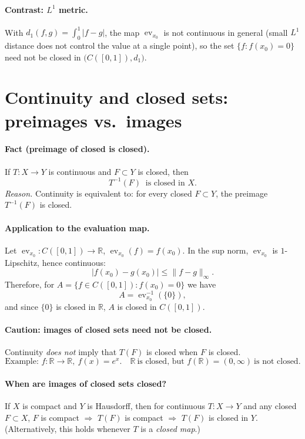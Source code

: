 \documentclass[12pt,a4paper]{article}
\begin{document}
\paragraph{Contrast: $L^1$ metric.}
With $d_1(f,g)=\int_0^1 |f-g|$, the map $\operatorname{ev}_{x_0}$ is not continuous in general
(small $L^1$ distance does not control the value at a single point),
so the set $\{f:f(x_0)=0\}$ need not be closed in $\big(C([0,1]),d_1\big)$.

\section*{Continuity and closed sets: preimages vs.\ images}

\paragraph{Fact (preimage of closed is closed).}
If $T:X\to Y$ is continuous and $F\subset Y$ is closed, then
\[
T^{-1}(F)\ \text{ is closed in } X.
\]
\emph{Reason.} Continuity is equivalent to: for every closed $F\subset Y$, the preimage $T^{-1}(F)$ is closed.

\paragraph{Application to the evaluation map.}
Let $\operatorname{ev}_{x_0}:C([0,1])\to\mathbb{R}$, $\operatorname{ev}_{x_0}(f)=f(x_0)$.  
In the sup norm, $\operatorname{ev}_{x_0}$ is $1$-Lipschitz, hence continuous:
\[
|f(x_0)-g(x_0)|\le \|f-g\|_\infty.
\]
Therefore, for $A=\{f\in C([0,1]):f(x_0)=0\}$ we have
\[
A=\operatorname{ev}_{x_0}^{-1}(\{0\}),
\]
and since $\{0\}$ is closed in $\mathbb{R}$, $A$ is closed in $C([0,1])$.

\paragraph{Caution: images of closed sets need not be closed.}
Continuity \emph{does not} imply that $T(F)$ is closed when $F$ is closed.
\[
\text{Example: } f:\mathbb{R}\to\mathbb{R},\ f(x)=e^x.
\quad \mathbb{R}\ \text{is closed, but } f(\mathbb{R})=(0,\infty)\ \text{is not closed.}
\]

\paragraph{When are images of closed sets closed?}
If $X$ is compact and $Y$ is Hausdorff, then for continuous $T:X\to Y$ and any closed $F\subset X$,
$F$ is compact $\Rightarrow$ $T(F)$ is compact $\Rightarrow$ $T(F)$ is closed in $Y$.
(Alternatively, this holds whenever $T$ is a \emph{closed map}.)
\end{document}
